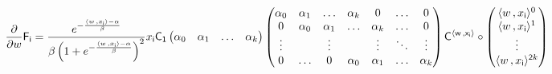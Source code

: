 \documentclass[a4paper,12pt]{article}
\begin{document}
\begin{displaymath}
    {\partial\over{\partial w}} \mathsf{F_i} = {e^{-{\langle w \,, x_{\mathsf{i}}\rangle - \alpha\over{\beta}}}\over{\beta\left(1 + e^{-{\langle w \,, x_{\mathsf{i}}\rangle - \alpha\over{\beta}}}\right)^2}} x_{\mathsf{i}} \mathsf{C_1} \begin{pmatrix}
        \alpha_0 & \alpha_1 & \ldots & \alpha_k \\
    \end{pmatrix} \begin{pmatrix}
        \alpha_0 & \alpha_1 & \ldots & \alpha_k & 0 & \ldots & 0 \\
        0 & \alpha_0 & \alpha_1 & \ldots & \alpha_k & \ldots & 0 \\
        \vdots &  & \vdots &  & \vdots & \ddots & \vdots\\
        0 & \ldots & 0 & \alpha_0 & \alpha_1 &\ldots & \alpha_k \\
    \end{pmatrix} \mathsf{C^{\langle w \,, x_{\mathsf{i}}\rangle}}\circ \begin{pmatrix}
        \langle w \,, x_{\mathsf{i}}\rangle^{0} \\ \langle w \,, x_{\mathsf{i}}\rangle^{1} \\ \vdots \\ \langle w \,, x_{\mathsf{i}}\rangle^{\mathsf{2}k} \\
    \end{pmatrix}
\end{displaymath}\\
\end{document}
